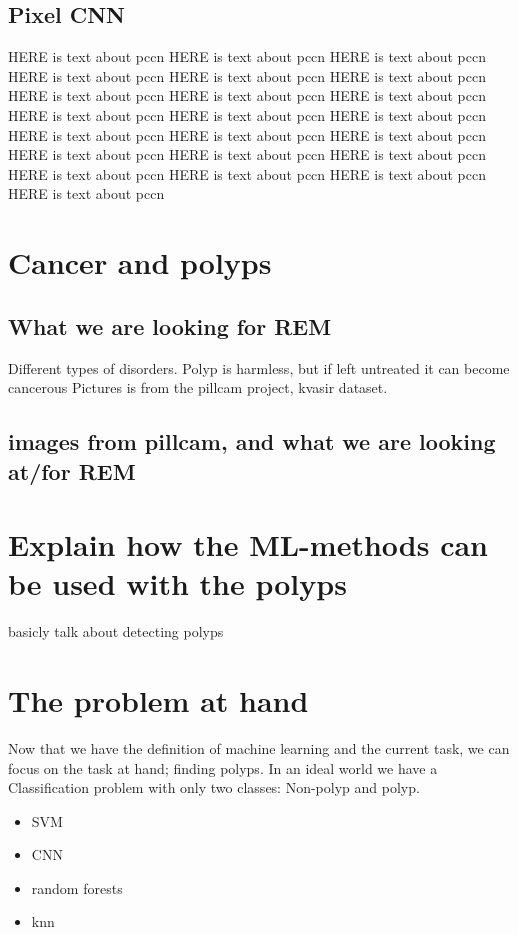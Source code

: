    
    \subsection{Pixel CNN}
      HERE is text about pccn
      HERE is text about pccn
      HERE is text about pccn
      HERE is text about pccn
      HERE is text about pccn
      HERE is text about pccn
      HERE is text about pccn
      HERE is text about pccn
      HERE is text about pccn
      HERE is text about pccn
      HERE is text about pccn
      HERE is text about pccn
      HERE is text about pccn
      HERE is text about pccn
      HERE is text about pccn
      HERE is text about pccn
      HERE is text about pccn
      HERE is text about pccn
      HERE is text about pccn
      HERE is text about pccn
      HERE is text about pccn
      HERE is text about pccn
    


\section{Cancer and polyps}
	  \subsection{What we are looking for REM}
	  Different types of disorders.
	  Polyp is harmless, but if left untreated it can become cancerous
	  Pictures is from the pillcam project, kvasir dataset.
	  \subsection{images from pillcam, and what we are looking at/for REM}
	  

	  
	  

	    
	  
\section{Explain how the ML-methods can be used with the polyps}
	basicly talk about detecting polyps
	
	  
	  
	  
\section{The problem at hand}
	  Now that we have the definition of machine learning and the current task, we can focus on the task at hand; finding polyps. In an ideal world we have a
	  Classification problem with only two classes: Non-polyp and polyp. 
	  
	  \begin{itemize}
	    \item SVM 
	    \item CNN 
	    \item random forests
	    \item knn
	  \end{itemize}
	  
	
	
